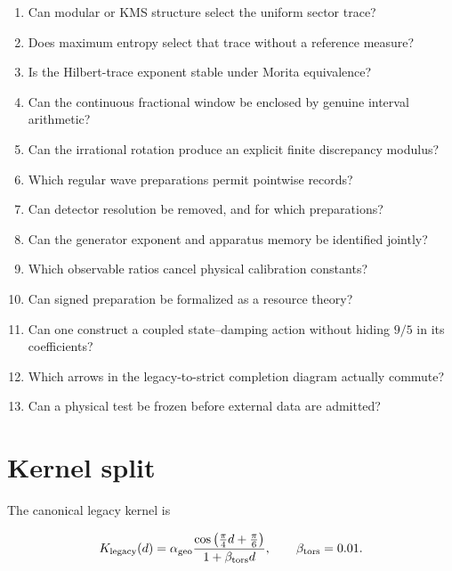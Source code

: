 \documentclass[11pt,a4paper,openany]{report}
\begin{document}
\begin{enumerate}
\item 
Can modular or KMS structure select the uniform sector trace?

\item 
Does maximum entropy select that trace without a reference measure?

\item 
Is the Hilbert-trace exponent stable under Morita equivalence?

\item 
Can the continuous fractional window be enclosed by genuine interval arithmetic?

\item 
Can the irrational rotation produce an explicit finite discrepancy modulus?

\item 
Which regular wave preparations permit pointwise records?

\item 
Can detector resolution be removed, and for which preparations?

\item 
Can the generator exponent and apparatus memory be identified jointly?

\item 
Which observable ratios cancel physical calibration constants?

\item 
Can signed preparation be formalized as a resource theory?

\item 
Can one construct a coupled state--damping action without hiding \(9/5\) in its coefficients?

\item 
Which arrows in the legacy-to-strict completion diagram actually commute?

\item 
Can a physical test be frozen before external data are admitted?

\end{enumerate}

\section{Kernel split}

The canonical legacy kernel is

\[
K_{\rm legacy}(d)
=
\alpha_{\rm geo}
\frac{\cos\left(\frac\pi4d+\frac\pi6\right)}
{1+\beta_{\rm tors}d},
\qquad
\beta_{\rm tors}=0.01.
\]
\end{document}
